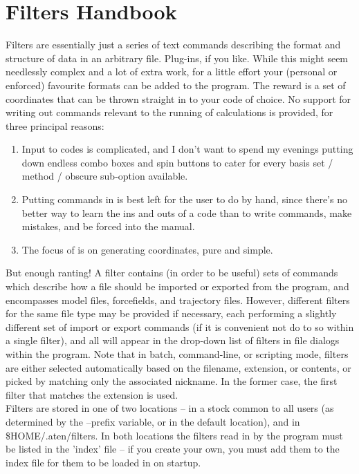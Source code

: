 \chapter{Filters Handbook}
\label{sec:filterhandbook}

Filters are essentially just a series of text commands describing the format and structure of data in an arbitrary file. Plug-ins, if you like. While this might seem needlessly complex and a lot of extra work, for a little effort your (personal or enforced) favourite formats can be added to the program. The reward is a set of coordinates that can be thrown straight in to your code of choice. No support for writing out commands relevant to the running of calculations is provided, for three principal reasons:

\begin{enumerate}
	\item Input to codes is complicated, and I don't want to spend my evenings putting down endless combo boxes and spin buttons to cater for every basis set / method / obscure sub-option available.
	\item Putting commands in is best left for the user to do by hand, since there's no better way to learn the ins and outs of a code than to write commands, make mistakes, and be forced into the manual.
	\item The focus of \progname{} is on generating coordinates, pure and simple.
\end{enumerate}

But enough ranting! A filter contains (in order to be useful) sets of commands which describe how a file should be imported or exported from the program, and encompasses model files, forcefields, and trajectory files. However, different filters for the same file type may be provided if necessary, each performing a slightly different set of import or export commands (if it is convenient not do to so within a single filter), and all will appear in the drop-down list of filters in file dialogs within the program. Note that in batch, command-line, or scripting mode, filters are either selected automatically based on the filename, extension, or contents, or picked by matching only the associated nickname. In the former case, the first filter that matches the extension is used.\\

Filters are stored in one of two locations -- in a stock common to all users (as determined by the --prefix variable, or in the default location), and in \$HOME/.aten/filters. In both locations the filters read in by the program must be listed in the 'index' file -- if you create your own, you must add them to the index file for them to be loaded in on startup.\\

